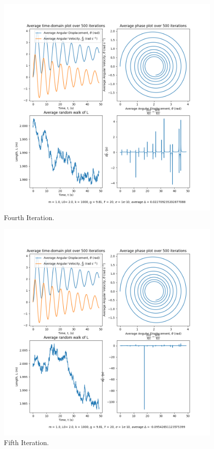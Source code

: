 \documentclass[10pt, twocolumn]{article}
\begin{document}
\begin{figure}
    \centering
    \includegraphics[width = \columnwidth]{Projects/ForcedSimplePendulum/Plots/m = 1.0, L0= 2.0, k = 1000, g = 9.81, F = 20, sigma = 1e-10, run number 3.png}
    \caption{Fourth Iteration.}
    \label{fig:enter-label}
\end{figure}

\begin{figure}
    \centering
    \includegraphics[width = \columnwidth]{Projects/ForcedSimplePendulum/Plots/m = 1.0, L0= 2.0, k = 1000, g = 9.81, F = 20, sigma = 1e-10, run number 4.png}
    \caption{Fifth Iteration.}
    \label{fig:enter-label}
\end{figure}
\end{document}
